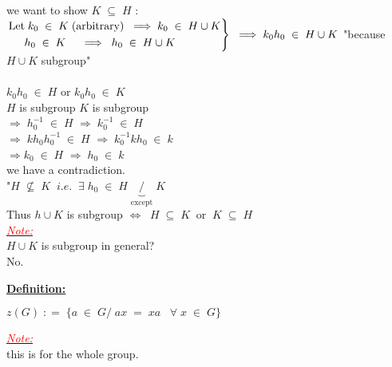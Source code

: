 \documentclass{report}
\newenvironment{Definition}%
{%
  \par\vspace{\baselineskip}\noindent
  \textbf{\underline{\large{Definition:}}}\begin{itshape}%
  \par\vspace{\baselineskip}\noindent\ignorespaces
}%
{%
  \end{itshape}\ignorespacesafterend
}
\begin{document}
we want to show $K \; \subseteq \; H$ :\\
$\begin{rcases}
\text{Let} \; k_0 \; \in \; K \; (\text{arbitrary}) \; \; \Longrightarrow \; k_0 \; \in \; H \cup K\\
\hspace*{0.5cm} h_0 \; \in \; K \; \; \; \; \; \Longrightarrow \; \; h_0 \; \in \; H \cup K
\end{rcases} \; \; \Longrightarrow \; k_0 h_0 \; \in \; H \cup K$ "because $H \cup K$ subgroup"\\
\vspace{0.1cm}\\
$k_0 h_0 \; \in \; H$ \hspace{1cm} or \hspace{1cm} $k_0 h_0 \; \in \; K$\\
$H$ is subgroup \hspace{2cm} $K$ is subgroup\\
$\Longrightarrow \; h_0^{-1} \; \in \; H$ \hspace{2.2cm} $\Longrightarrow \; k_0^{-1} \; \in \; H$ \\
$\Longrightarrow \; kh_0h_0^{-1} \; \in \; H$ \hspace{1.6cm} $\Longrightarrow \; k_0^{-1}kh_0 \; \in \; k$ \\
$\Longrightarrow k_0 \; \in \; H$ \hspace{2.5cm} $\Longrightarrow \; h_0 \; \in \; k$ \\
\newline
\hspace*{0.5cm} we have a contradiction. \\
"$ H \; \not\subseteq \; K \; \; i.e. \; \; \exists \; h_0 \; \in \; H \; \underbrace{/}_{\text{except}} \; K$\\
Thus $h \cup K$ is subgroup $\Longleftrightarrow \; \; H \; \subseteq \; K \; \; \text{or} \; \; K \; \subseteq \; H$\\
\newline
\emph{\underline{\textcolor{red}{Note:}}}\\
$H \cup K$ \; is  subgroup in general?\\
No.\\

\begin{tcolorbox}[breakable, enhanced, sharp corners, colback=white!30, colframe=green!80!blue, title="Center of a group"]
\begin{Definition}
$z(G) \; \colon= \; \{a \; \in \; G / \; ax \; = \; xa \; \; \; \forall \; x \; \in \; G\}$
\end{Definition}
\end{tcolorbox}
\emph{\underline{\textcolor{red}{Note:}}}\\
this is for the whole group.\\
\vspace{0.3cm}\\
\end{document}
